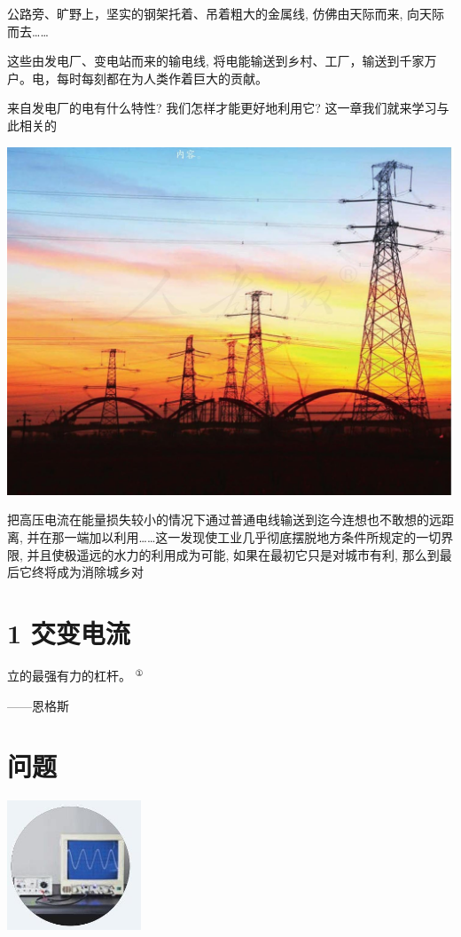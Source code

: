 \documentclass[10pt]{article}
\begin{document}
公路旁、旷野上，坚实的钢架托着、吊着粗大的金属线, 仿佛由天际而来, 向天际而去……

这些由发电厂、变电站而来的输电线, 将电能输送到乡村、工厂，输送到千家万户。电，每时每刻都在为人类作着巨大的贡献。

来自发电厂的电有什么特性? 我们怎样才能更好地利用它? 这一章我们就来学习与此相关的

\begin{center}
\includegraphics[max width=1.0\textwidth]{images/01910e72-c5b7-7ed5-a6d4-fb3a5faefc32_53_779970.jpg}
\end{center}

把高压电流在能量损失较小的情况下通过普通电线输送到迄今连想也不敢想的远距离, 并在那一端加以利用……这一发现使工业几乎彻底摆脱地方条件所规定的一切界限, 并且使极遥远的水力的利用成为可能, 如果在最初它只是对城市有利, 那么到最后它终将成为消除城乡对

\section*{1 交变电流}

立的最强有力的杠杆。 \({}^{\text{①}}\)

——恩格斯

\section*{问题}

\begin{center}
\includegraphics[max width=0.3\textwidth]{images/01910e72-c5b7-7ed5-a6d4-fb3a5faefc32_54_486699.jpg}
\end{center}
\end{document}
